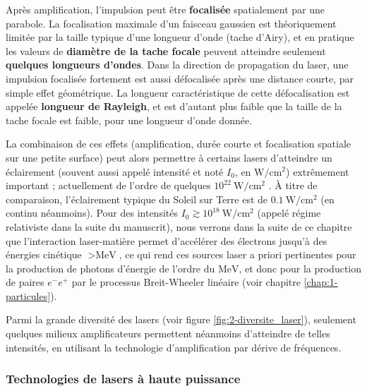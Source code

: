 \begin{refsection}
Après amplification, l'impulsion peut être \textbf{focalisée} spatialement par une parabole. La focalisation maximale d'un faisceau gaussien est théoriquement limitée par la taille typique d'une longueur d'onde (tache d'Airy), et en pratique les valeurs de \textbf{diamètre de la tache focale} peuvent atteindre seulement \textbf{quelques longueurs d'ondes}. Dans la direction de propagation du laser, une impulsion focalisée fortement est aussi défocalisée après une distance courte, par simple effet géométrique. La longueur caractéristique de cette défocalisation est appelée \textbf{longueur de Rayleigh}, et est d'autant plus faible que la taille de la tache focale est faible, pour une longueur d'onde donnée.

La combinaison de ces effets (amplification, durée courte et focalisation spatiale sur une petite surface) peut alors permettre à certains lasers d'atteindre un éclairement (souvent aussi appelé intensité et noté $I_0$, en $\si{\W \per \cm^2}$) extrêmement important ; actuellement de l'ordre de quelques $10^{22} ~ \si{\W \per \cm^2}$ \parencite{danson_2019}. À titre de comparaison, l'éclairement typique du Soleil sur Terre est de $0.1 ~ \si{\W \per \cm^2}$ (en continu néanmoins). Pour des intensités $I_0\gtrsim 10^{18} ~ \si{\W \per \cm^2}$ (appelé régime relativiste dans la suite du manuscrit), nous verrons dans la suite de ce chapitre que l'interaction laser-matière permet d'accélérer des électrons jusqu'à des énergies cinétique $> \si{\MeV}$, ce qui rend ces sources laser a priori pertinentes pour la production de photons d'énergie de l'ordre du $\si{\MeV}$, et donc pour la production de paires $e^-e^+$ par le processus Breit-Wheeler linéaire (voir chapitre \ref{chap:1-particules}).

Parmi la grande diversité des lasers (voir figure \ref{fig:2-diversite_laser}), seulement quelques milieux amplificateurs permettent néanmoins d'atteindre de telles intensités, en utilisant la technologie d'amplification par dérive de fréquences.

\subsubsection{Technologies de lasers à haute puissance}


\end{refsection}
